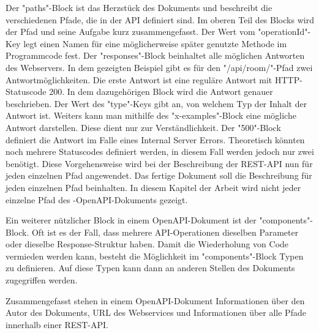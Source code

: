 Der "paths"-Block ist das Herzstück des Dokuments und beschreibt die verschiedenen Pfade, die in der API definiert sind. Im oberen Teil des Blocks wird der Pfad und seine Aufgabe kurz zusammengefasst. Der Wert vom "operationId"-Key legt einen Namen für eine möglicherweise später genutzte Methode im Programmcode fest. Der "responses"-Block beinhaltet alle möglichen Antworten des Webservers. In dem gezeigten Beispiel gibt es für den "/api/room/"-Pfad zwei Antwortmöglichkeiten. Die erste Antwort ist eine reguläre Antwort mit HTTP-Statuscode 200. In dem dazugehörigen Block wird die Antwort genauer beschrieben. Der Wert des "type"-Keys gibt an, von welchem Typ der Inhalt der Antwort ist. Weiters kann man mithilfe des "x-examples"-Block eine mögliche Antwort darstellen. Diese dient nur zur Verständlichkeit. Der "500"-Block definiert die Antwort im Falle eines Internal Server Errors. Theoretisch könnten noch mehrere Statuscodes definiert werden, in diesem Fall werden jedoch nur zwei benötigt. Diese Vorgehensweise wird bei der Beschreibung der REST-API nun für jeden einzelnen Pfad angewendet. Das fertige Dokument soll die Beschreibung für jeden einzelnen Pfad beinhalten. In diesem Kapitel der Arbeit wird nicht jeder einzelne Pfad des \ZELIA-OpenAPI-Dokuments gezeigt. \cite{OpenAPI}


Ein weiterer nützlicher Block in einem OpenAPI-Dokument ist der "components"-Block. Oft ist es der Fall, dass mehrere API-Operationen dieselben Parameter oder dieselbe Response-Struktur haben. Damit die Wiederholung von Code vermieden werden kann, besteht die Möglichkeit im "components"-Block Typen zu definieren. Auf diese Typen kann dann an anderen Stellen des Dokuments zugegriffen werden. 


Zusammengefasst stehen in einem OpenAPI-Dokument Informationen über den Autor des Dokuments, URL des Webservices und Informationen über alle Pfade innerhalb einer REST-API. \cite{OpenAPI}

